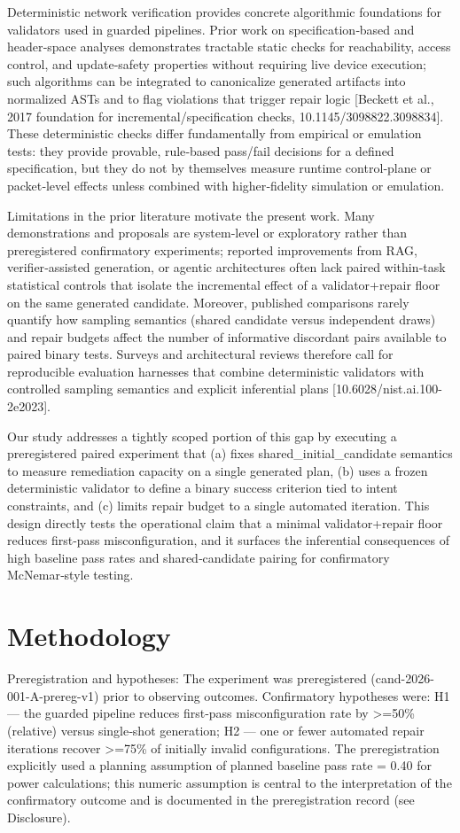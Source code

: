 \documentclass[conference]{IEEEtran}
\begin{document}
Deterministic network verification provides concrete algorithmic foundations for validators used in guarded pipelines. Prior work on specification‑based and header‑space analyses demonstrates tractable static checks for reachability, access control, and update‑safety properties without requiring live device execution; such algorithms can be integrated to canonicalize generated artifacts into normalized ASTs and to flag violations that trigger repair logic [Beckett et al., 2017 foundation for incremental/specification checks, 10.1145/3098822.3098834]. These deterministic checks differ fundamentally from empirical or emulation tests: they provide provable, rule‑based pass/fail decisions for a defined specification, but they do not by themselves measure runtime control‑plane or packet‑level effects unless combined with higher‑fidelity simulation or emulation.

Limitations in the prior literature motivate the present work. Many demonstrations and proposals are system‑level or exploratory rather than preregistered confirmatory experiments; reported improvements from RAG, verifier‑assisted generation, or agentic architectures often lack paired within‑task statistical controls that isolate the incremental effect of a validator+repair floor on the same generated candidate. Moreover, published comparisons rarely quantify how sampling semantics (shared candidate versus independent draws) and repair budgets affect the number of informative discordant pairs available to paired binary tests. Surveys and architectural reviews therefore call for reproducible evaluation harnesses that combine deterministic validators with controlled sampling semantics and explicit inferential plans [10.6028/nist.ai.100-2e2023].

Our study addresses a tightly scoped portion of this gap by executing a preregistered paired experiment that (a) fixes shared\_initial\_candidate semantics to measure remediation capacity on a single generated plan, (b) uses a frozen deterministic validator to define a binary success criterion tied to intent constraints, and (c) limits repair budget to a single automated iteration. This design directly tests the operational claim that a minimal validator+repair floor reduces first‑pass misconfiguration, and it surfaces the inferential consequences of high baseline pass rates and shared‑candidate pairing for confirmatory McNemar‑style testing.

\section{Methodology}
Preregistration and hypotheses: The experiment was preregistered (cand-2026-001-A-prereg-v1) prior to observing outcomes. Confirmatory hypotheses were: H1 --- the guarded pipeline reduces first‑pass misconfiguration rate by >=50\% (relative) versus single‑shot generation; H2 --- one or fewer automated repair iterations recover >=75\% of initially invalid configurations. The preregistration explicitly used a planning assumption of planned baseline pass rate = 0.40 for power calculations; this numeric assumption is central to the interpretation of the confirmatory outcome and is documented in the preregistration record (see Disclosure).
\end{document}
